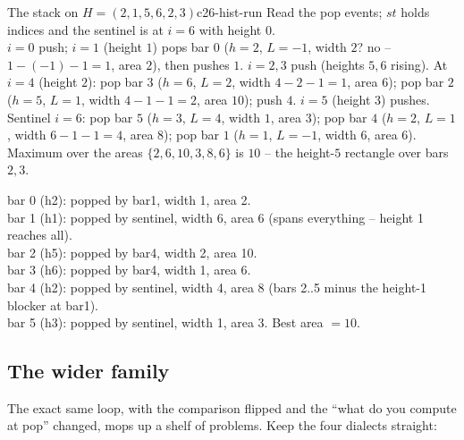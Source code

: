 \begin{example}{The stack on $H=(2,1,5,6,2,3)$}{c26-hist-run}
Read the pop events; $\mathit{st}$ holds indices and the sentinel is at $i=6$ with height $0$.\\
$i{=}0$ push; $i{=}1$ (height $1$) pops bar $0$ ($h=2$, $L=-1$, width $2$? no -- $1-(-1)-1=1$, area $2$),
then pushes $1$. $i{=}2,3$ push (heights $5,6$ rising). At $i{=}4$ (height $2$): pop bar $3$ ($h=6$,
$L=2$, width $4-2-1=1$, area $6$); pop bar $2$ ($h=5$, $L=1$, width $4-1-1=2$, area $10$); push $4$.
$i{=}5$ (height $3$) pushes. Sentinel $i{=}6$: pop bar $5$ ($h=3$, $L=4$, width $1$, area $3$); pop bar
$4$ ($h=2$, $L=1$, width $6-1-1=4$, area $8$); pop bar $1$ ($h=1$, $L=-1$, width $6$, area $6$).
Maximum over the areas $\{2,6,10,3,8,6\}$ is $\boxed{10}$ -- the height-$5$ rectangle over bars $2,3$. \checkmark
\end{example}
\begin{tracebox}
bar 0 (h2): popped by bar1, width 1, area 2.\\
bar 1 (h1): popped by sentinel, width 6, area 6 (spans everything -- height 1 reaches all).\\
bar 2 (h5): popped by bar4, width 2, area 10.\\
bar 3 (h6): popped by bar4, width 1, area 6.\\
bar 4 (h2): popped by sentinel, width 4, area 8 (bars 2..5 minus the height-1 blocker at bar1).\\
bar 5 (h3): popped by sentinel, width 1, area 3.  Best area $=10$.
\end{tracebox}

\subsection{The wider family}

The exact same loop, with the comparison flipped and the ``what do you compute at pop'' changed, mops up
a shelf of problems. Keep the four dialects straight:

